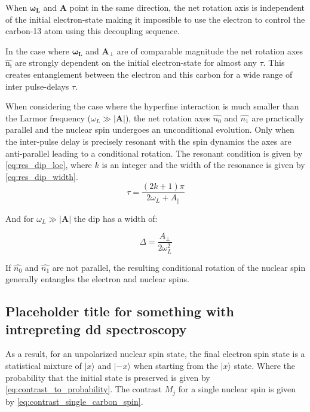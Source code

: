 When $\bm{\omega_L}$ and $\bm{A}$ point in the same direction, the net rotation axis is independent of the initial electron-state making it impossible to use the electron to control the carbon-13 atom using this decoupling sequence.

In the case where $\bm{\omega_L}$ and $\bm{A_\perp}$ are of comparable magnitude the net rotation axes $\bm{\hat{\mathrm{n_i}}}$ are strongly dependent on the initial electron-state for almost any $\tau$. This creates entanglement between the electron and this carbon for a wide range of inter pulse-delays $\tau$.

When considering the case where the hyperfine interaction is much smaller than the Larmor frequency ($\omega_L \gg |\bm{A}|$), the net rotation axes  $\hat{n_0}$ and $\hat{n_1}$ are practically parallel and the nuclear spin undergoes an unconditional evolution.
Only when the inter-pulse delay is precisely resonant with the spin dynamics the axes are anti-parallel leading to a conditional rotation\citep{Taminiau2012Detection}.
The resonant condition is given by \cref{eq:res_dip_loc}, where $k$ is an integer and the width of the resonance is given by \cref{eq:res_dip_width}.
 \begin{equation}
\tau = \frac{(2k+1)\pi}{2 \omega_L + A_\parallel}
\label{eq:res_dip_loc}
\end{equation}

And for $\omega_L \gg |\bm{A}|$ the dip has a width of:

 \begin{equation}
\Delta = \frac{A_\perp}{2 \omega_L^2}
\label{eq:res_dip_width}
\end{equation}

If  $\hat{n_0}$ and $\hat{n_1}$ are not parallel, the resulting conditional rotation of the nuclear spin generally entangles the electron and nuclear spins.

\subsection{Placeholder title for something with intrepreting dd spectroscopy }

As a result, for an unpolarized nuclear spin state, the final electron spin state is a statistical mixture of $|x\rangle$ and $|-x\rangle$ when starting from the $|x\rangle$  state. Where the probability that the initial state is preserved is given by \cref{eq:contrast_to_probability}. The contrast $M_j$ for a single nuclear spin is given by \cref{eq:contrast_single_carbon_spin}\citep{Taminiau2012Detection}.

